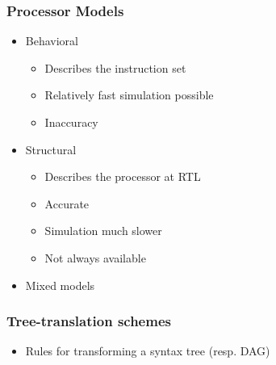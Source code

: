 \subsubsection{Processor Models}
\begin{itemize}
	\item Behavioral 
\begin{itemize}
	\item Describes the instruction set
	\item Relatively fast simulation possible
	\item Inaccuracy
\end{itemize}
	\item Structural
\begin{itemize}
	\item Describes the processor at RTL
	\item Accurate
	\item Simulation much slower
	\item Not always available
\end{itemize}
	\item Mixed models
\end{itemize}

\subsubsection{Tree-translation schemes}
\begin{itemize}
	\item Rules for transforming a syntax tree (resp. DAG)
\end{itemize}



 










